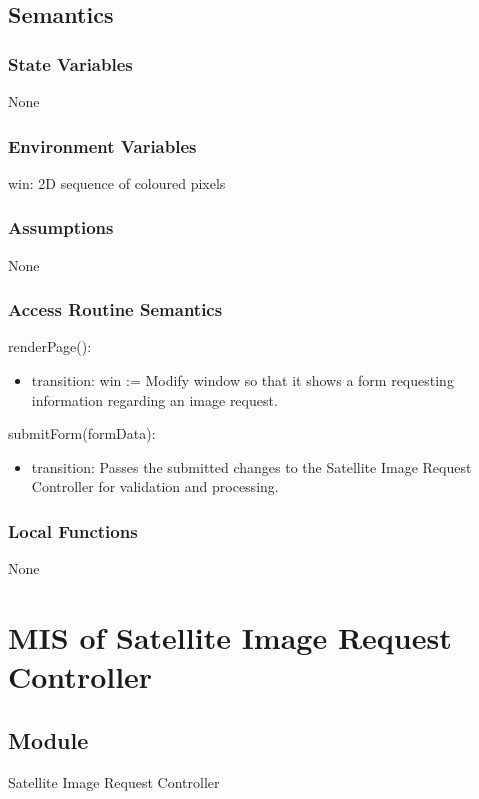 \documentclass[12pt, titlepage]{article}
\begin{document}
\subsection{Semantics}

\subsubsection{State Variables}
None
\subsubsection{Environment Variables}
win: 2D sequence of coloured pixels

\subsubsection{Assumptions}
None

\subsubsection{Access Routine Semantics}

\noindent renderPage():
\begin{itemize}
\item transition: win := Modify window so that it shows a form requesting information regarding an image request.
\end{itemize}

\noindent submitForm(formData):
\begin{itemize}
\item transition: Passes the submitted changes to the Satellite Image Request Controller for validation and processing.
\end{itemize}

\subsubsection{Local Functions}
None

\section{MIS of Satellite Image Request Controller} \label{sirc}

\subsection{Module}

Satellite Image Request Controller
\end{document}
